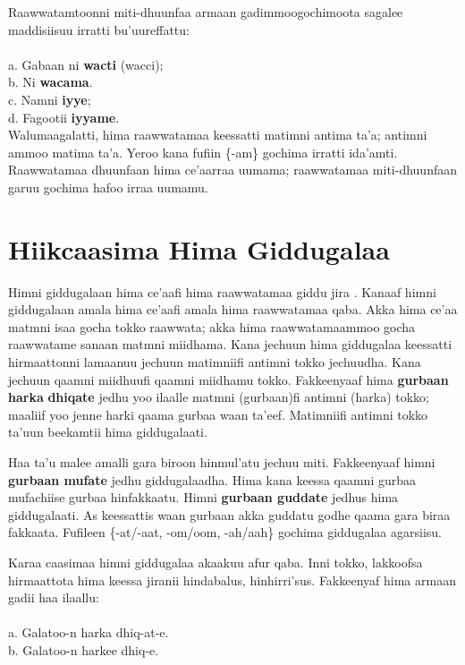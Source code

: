 \documentclass[11pt,b5paper]{book}
\begin{document}
Raawwatamtoonni miti-dhuunfaa armaan gadimmoogochimoota sagalee maddisiisuu irratti bu’uureffattu:\\
\\
a. Gabaan ni \textbf{wacti} (wacci);\\
b. Ni \textbf{wacama}.\\
c. Namni \textbf{iyye}; \\
d. Fagootii \textbf{iyyame}.\\

Walumaagalatti, hima raawwatamaa keessatti matimni antima ta’a; antimni ammoo matima ta’a. Yeroo kana fufiin \{-am\} gochima irratti ida’amti. Raawwatamaa dhuunfaan hima ce’aarraa uumama; raawwatamaa miti-dhuunfaan garuu gochima hafoo irraa uumamu. 

\section{Hiikcaasima Hima Giddugalaa }

Himni giddugalaan hima ce’aafi hima raawwatamaa giddu jira \cite{kemmer1993middle,tolemariam2009}. Kanaaf himni giddugalaan amala hima ce’aafi amala hima raawwatamaa qaba. Akka hima ce’aa matmni isaa gocha tokko raawwata; akka hima raawwatamaammoo gocha raawwatame sanaan matmni miidhama. Kana jechuun hima giddugalaa keessatti hirmaattonni lamaanuu jechuun matimniifi antimni tokko jechuudha. Kana jechuun qaamni miidhuufi qaamni miidhamu tokko. Fakkeenyaaf hima \textbf{gurbaan harka} \textbf{dhiqate} jedhu yoo ilaalle matmni (gurbaan)fi antimni (harka) tokko; maaliif yoo jenne harki qaama gurbaa waan ta’eef.
Matimniifi antimni tokko ta’uun beekamtii hima giddugalaati. 

Haa ta’u malee amalli gara biroon hinmul’atu jechuu miti. Fakkeenyaaf himni \textbf{gurbaan mufate} jedhu giddugalaadha. Hima kana keessa qaamni gurbaa mufachiise gurbaa hinfakkaatu. Himni \textbf{gurbaan guddate }jedhus hima giddugalaati. As keessattis waan gurbaan akka guddatu godhe
qaama gara biraa fakkaata. Fufileen \{-at/-aat, -om/oom, -ah/aah\} gochima giddugalaa agarsiisu.

Karaa caasimaa himni giddugalaa akaakuu afur qaba. Inni
tokko, lakkoofsa hirmaattota hima keessa jiranii hindabalus,
hinhirri’sus. Fakkeenyaf hima armaan gadii haa ilaallu: \\
\\
a. Galatoo-n harka dhiq-at-e.\\
b. Galatoo-n harkee dhiq-e.\\
\end{document}

